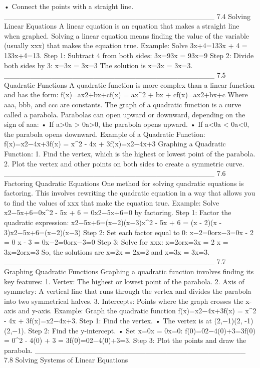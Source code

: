 •	Connect the points with a straight line.
________________________________________
7.4 Solving Linear Equations
A linear equation is an equation that makes a straight line when graphed. Solving a linear equation means finding the value of the variable (usually xxx) that makes the equation true.
Example: Solve 3x+4=133x + 4 = 133x+4=13.
Step 1: Subtract 4 from both sides:
3x=93x = 93x=9
Step 2: Divide both sides by 3:
x=3x = 3x=3
The solution is x=3x = 3x=3.
________________________________________
7.5 Quadratic Functions
A quadratic function is more complex than a linear function and has the form:
f(x)=ax2+bx+cf(x) = ax^2 + bx + cf(x)=ax2+bx+c
Where aaa, bbb, and ccc are constants.
The graph of a quadratic function is a curve called a parabola. Parabolas can open upward or downward, depending on the sign of aaa:
•	If a>0a > 0a>0, the parabola opens upward.
•	If a<0a < 0a<0, the parabola opens downward.
Example of a Quadratic Function:
f(x)=x2−4x+3f(x) = x^2 - 4x + 3f(x)=x2−4x+3
Graphing a Quadratic Function:
1.	Find the vertex, which is the highest or lowest point of the parabola.
2.	Plot the vertex and other points on both sides to create a symmetric curve.
________________________________________
7.6 Factoring Quadratic Equations
One method for solving quadratic equations is factoring. This involves rewriting the quadratic equation in a way that allows you to find the values of xxx that make the equation true.
Example: Solve x2−5x+6=0x^2 - 5x + 6 = 0x2−5x+6=0 by factoring.
Step 1: Factor the quadratic expression:
x2−5x+6=(x−2)(x−3)x^2 - 5x + 6 = (x - 2)(x - 3)x2−5x+6=(x−2)(x−3)
Step 2: Set each factor equal to 0:
x−2=0orx−3=0x - 2 = 0 \quad {} \quad x - 3 = 0x−2=0orx−3=0
Step 3: Solve for xxx:
x=2orx=3x = 2 \quad {} \quad x = 3x=2orx=3
So, the solutions are x=2x = 2x=2 and x=3x = 3x=3.
________________________________________
7.7 Graphing Quadratic Functions
Graphing a quadratic function involves finding its key features:
1.	Vertex: The highest or lowest point of the parabola.
2.	Axis of symmetry: A vertical line that runs through the vertex and divides the parabola into two symmetrical halves.
3.	Intercepts: Points where the graph crosses the x-axis and y-axis.
Example: Graph the quadratic function f(x)=x2−4x+3f(x) = x^2 - 4x + 3f(x)=x2−4x+3.
Step 1: Find the vertex.
•	The vertex is at (2,−1)(2, -1)(2,−1).
Step 2: Find the y-intercept.
•	Set x=0x = 0x=0: f(0)=02−4(0)+3=3f(0) = 0^2 - 4(0) + 3 = 3f(0)=02−4(0)+3=3.
Step 3: Plot the points and draw the parabola.
________________________________________
7.8 Solving Systems of Linear Equations
